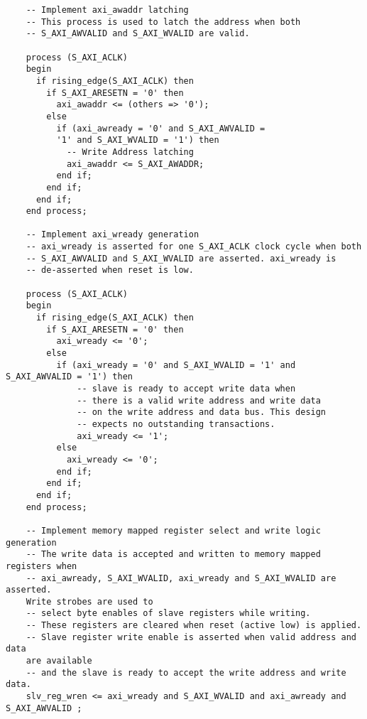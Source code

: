 \begin{lstlisting}
	-- Implement axi_awaddr latching
	-- This process is used to latch the address when both 
	-- S_AXI_AWVALID and S_AXI_WVALID are valid. 

	process (S_AXI_ACLK)
	begin
	  if rising_edge(S_AXI_ACLK) then 
	    if S_AXI_ARESETN = '0' then
	      axi_awaddr <= (others => '0');
	    else
	      if (axi_awready = '0' and S_AXI_AWVALID =
          '1' and S_AXI_WVALID = '1') then
	        -- Write Address latching
	        axi_awaddr <= S_AXI_AWADDR;
	      end if;
	    end if;
	  end if;                   
	end process; 

	-- Implement axi_wready generation
	-- axi_wready is asserted for one S_AXI_ACLK clock cycle when both
	-- S_AXI_AWVALID and S_AXI_WVALID are asserted. axi_wready is 
	-- de-asserted when reset is low. 

	process (S_AXI_ACLK)
	begin
	  if rising_edge(S_AXI_ACLK) then 
	    if S_AXI_ARESETN = '0' then
	      axi_wready <= '0';
	    else
	      if (axi_wready = '0' and S_AXI_WVALID = '1' and S_AXI_AWVALID = '1') then
	          -- slave is ready to accept write data when 
	          -- there is a valid write address and write data
	          -- on the write address and data bus. This design 
	          -- expects no outstanding transactions.           
	          axi_wready <= '1';
	      else
	        axi_wready <= '0';
	      end if;
	    end if;
	  end if;
	end process; 

	-- Implement memory mapped register select and write logic generation
	-- The write data is accepted and written to memory mapped registers when
	-- axi_awready, S_AXI_WVALID, axi_wready and S_AXI_WVALID are asserted.
    Write strobes are used to
	-- select byte enables of slave registers while writing.
	-- These registers are cleared when reset (active low) is applied.
	-- Slave register write enable is asserted when valid address and data 
    are available
	-- and the slave is ready to accept the write address and write data.
	slv_reg_wren <= axi_wready and S_AXI_WVALID and axi_awready and S_AXI_AWVALID ;


\end{lstlisting}
